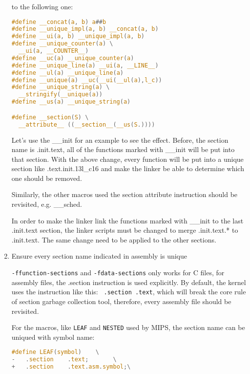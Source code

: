 \documentclass[10pt,a4paper]{article}
\begin{document}
\begin{multicols}{2}
\begin{enumerate}
to the following one:

\begin{lstlisting}[language=c,
                  commentstyle=\fontsize{7}{8}\selectfont,
                  basicstyle=\ttfamily\fontsize{7}{8}\selectfont]
#define __concat(a, b) a##b
#define __unique_impl(a, b) __concat(a, b)
#define __ui(a, b) __unique_impl(a, b)
#define __unique_counter(a) \
  __ui(a, __COUNTER__)
#define __uc(a) __unique_counter(a)
#define __unique_line(a) __ui(a, __LINE__)
#define __ul(a) __unique_line(a)
#define __unique(a) __uc(__ui(__ul(a),l_c))
#define __unique_string(a) \
  __stringify(__unique(a))
#define __us(a) __unique_string(a)

#define __section(S) \
  __attribute__ ((__section__(__us(S.))))
\end{lstlisting}

Let's use the \_\_init for an example to see the effect. Before, the section
name is .init.text, all of the functions marked with \_\_init will be put into
that section. With the above change, every function will be put into a unique
section like .text.init.13l\_c16 and make the linker be able to determine which
one should be removed.

Similarly, the other macros used the section attribute instruction should be
revisited, e.g. \_\_sched.

In order to make the linker link the functions marked with \_\_init to the last
.init.text section, the linker scripts must be changed to merge .init.text.* to
.init.text. The same change need to be applied to the other sections.

\item Ensure every section name indicated in assembly is unique

{\small {\tt -ffunction-sections}} and {\small {\tt -fdata-sections}} only
works for C files, for assembly files, the .section instruction is used
explicitly. By default, the kernel uses the instruction like this: {\small {\tt
.section .text}}, which will break the core rule of section garbage collection
tool, therefore, every assembly file should be revisited.

For the macros, like {\small {\tt LEAF}} and {\small {\tt NESTED}} used by
MIPS, the section name can be uniqued with symbol name:

\begin{lstlisting}[language=c,
                  commentstyle=\fontsize{7}{8}\selectfont,
                  basicstyle=\ttfamily\fontsize{7}{8}\selectfont]
#define LEAF(symbol)	\
-	.section	.text;		 \
+	.section	.text.asm.symbol;\
\end{lstlisting}


\end{enumerate}
\end{multicols}
\end{document}
